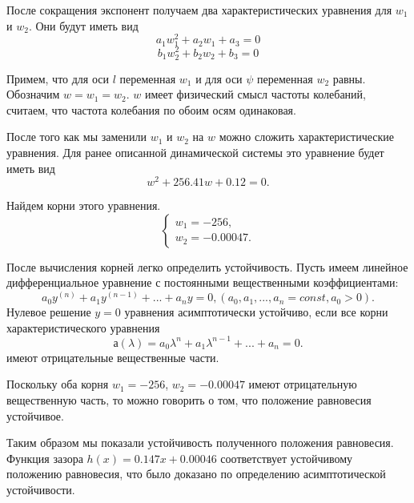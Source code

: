 \documentclass[a4paper,14pt]{extarticle}
\begin{document}
После сокращения экспонент получаем два характеристических уравнения для $w_1$ и $w_2$.
Они будут иметь вид
\begin{equation*} 
     a_1 w_1^2	+ a_2 w_1 + a_3= 0
\end{equation*}
\begin{equation*}
	b_1 w_2^2	+ b_2 w_2 + b_3= 0
\end{equation*}

Примем, что для оси $l$ переменная $w_1$ и для оси $\psi$ переменная $w_2$ равны. Обозначим $w = w_1 = w_2$. $w$ имеет физический смысл частоты колебаний,   считаем, что частота колебания по обоим осям одинаковая.

После того как мы заменили $w_1$ и $w_2$ на $w$ можно сложить характеристические уравнения. Для ранее описанной динамической системы это уравнение будет иметь вид
\begin{equation*} 
	w^2 + 256.41 w + 0.12 = 0.
\end{equation*}

\noindent Найдем корни этого уравнения.
\begin{equation*} 
	\begin{cases}
	w_1 = -256, \\
	w_2 = -0.00047.
	\end{cases}
\end{equation*}

После вычисления корней легко определить устойчивость. 
Пусть имеем линейное дифференциальное уравнение с постоянными вещественными коэффициентами:
\begin{equation*}
	a_0 y^{(n)} + a_1 y^{(n - 1)} + ... + a_n y  = 0, (a_0, a_1, ..., a_n = const, a_0 > 0).
\end{equation*}
Нулевое решение $y = 0$ уравнения асимптотически устойчиво, если все корни характеристического уравнения 
\begin{equation*}
	а(\lambda) = a_0 \lambda^n + a_1 \lambda^{n - 1} + ... + a_n = 0.
\end{equation*}
имеют отрицательные вещественные части.

Поскольку оба корня $w_1 = -256$, $w_2 = -0.00047$ имеют отрицательную вещественную часть, то можно говорить о том, что положение равновесия устойчивое.

Таким образом мы показали устойчивость полученного положения равновесия. Функция зазора $h(x) = 0.147 x + 0.00046$ соответствует устойчивому положению равновесия, что было доказано по определению асимптотической устойчивости.
\end{document}
